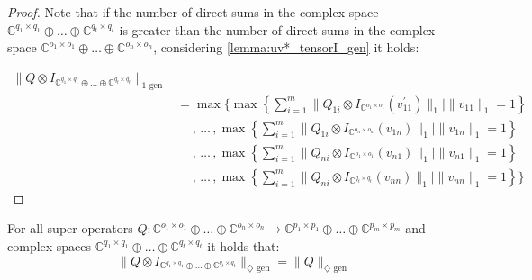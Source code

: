 \begin{proof}
  Note that if the number of direct sums in the complex space $\mathbb{C}^{q_1 \times q_1} \oplus \ldots \oplus \mathbb{C}^{q_t \times q_t}$ is greater than the number of direct sums in the complex space $\mathbb{C}^{o_1 \times o_1} \oplus \ldots \oplus \mathbb{C}^{o_n \times o_n}$, considering \autoref{lemma:uv*_tensorI_gen} it holds:

  \begin{equation} 
    \begin{split}
      \lVert Q \otimes I_{\mathbb{C}^{q_1 \times q_1} \oplus \ldots \oplus \mathbb{C}^{q_t \times q_t}} \rVert_{1 \text{ gen}} \\
      & =  \max  \Bigg\{ \max \left\{ \sum_{i=1}^{m} \|Q_{1i} \otimes I_{\mathbb{C}^{o_1 \times o_1}} (v_{11}^{'})\|_{1}    \mid  \|v_{11}\|_{1} = 1 \right\} \\
      & \hspace{15pt}, \hspace{2pt} \ldots \hspace{2pt}, \max \left\{ \sum_{i=1}^{m} \|Q_{1i} \otimes I_{\mathbb{C}^{o_n \times o_n}} (v_{1n})\|_{1}    \mid  \|v_{1n}\|_{1} = 1 \right\} \\ 
      & \hspace{15pt}, \hspace{2pt} \ldots \hspace{2pt}, \max \left\{ \sum_{i=1}^{m} \|Q_{ni} \otimes I_{\mathbb{C}^{o_1 \times o_1}} (v_{n1})\|_{1}    \mid  \|v_{n1}\|_{1} = 1 \right\} \\
    & \hspace{15pt}, \hspace{2pt} \ldots \hspace{2pt}, \max \left\{ \sum_{i=1}^{m} \|Q_{ni} \otimes I_{\mathbb{C}^{q_t \times q_t}} (v_{nn})\|_{1}   \mid  \|v_{nn}\|_{1} = 1 \right\} \Bigg\} 
    \end{split}
  \end{equation}

\end{proof}

 
 

\begin{corollary} \label{cor:tensor_stability}
  For all super-operators  $Q: \mathbb{C}^{o_1 \times o_1} \oplus \ldots \oplus \mathbb{C}^{o_n \times o_n}  \rightarrow \mathbb{C}^{p_1 \times p_1} \oplus \ldots \oplus  \mathbb{C}^{p_m \times p_m}$ and complex spaces $\mathbb{C}^{q_1 \times q_1} \oplus \ldots \oplus \mathbb{C}^{q_t \times q_t}$   it holds that:
\begin{equation}
   \lVert Q \otimes I_{\mathbb{C}^{q_1 \times q_1} \oplus \ldots \oplus \mathbb{C}^{q_t \times q_t}} \rVert_{\diamondsuit \text{ gen}} = \lVert Q \rVert_{\diamondsuit \text{ gen}} 
\end{equation}
\end{corollary}

